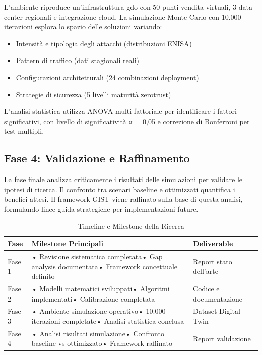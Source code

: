L'ambiente riproduce un'infrastruttura \gls{gdo} con 50 punti vendita virtuali, 3 data center regionali e integrazione cloud. La simulazione Monte Carlo con 10.000 iterazioni esplora lo spazio delle soluzioni variando:
\begin{itemize}
\item Intensità e tipologia degli attacchi (distribuzioni ENISA)
\item Pattern di traffico (dati stagionali reali)
\item Configurazioni architetturali (24 combinazioni deployment)
\item Strategie di sicurezza (5 livelli maturità \gls{zerotrust})
\end{itemize}

L'analisi statistica utilizza ANOVA multi-fattoriale per identificare i fattori significativi, con livello di significatività α = 0,05 e correzione di Bonferroni per test multipli.

\subsection{\texorpdfstring{Fase 4: Validazione e Raffinamento}{1.5.5 - Fase 4: Validazione e Raffinamento}}
\label{subsec:fase4}

La fase finale analizza criticamente i risultati delle simulazioni per validare le ipotesi di ricerca. Il confronto tra scenari baseline e ottimizzati quantifica i benefici attesi. Il framework GIST viene raffinato sulla base di questa analisi, formulando linee guida strategiche per implementazioni future.

\begin{table}[htbp]
\centering
\small
\caption{Timeline e Milestone della Ricerca}
\label{tab:timeline_ricerca}
\begin{tabularx}{\textwidth}{@{}lXl@{}}
\toprule
\textbf{Fase} & \textbf{Milestone Principali} & \textbf{Deliverable} \\
\midrule
Fase 1 & • Revisione sistematica completata\newline• Gap analysis documentata\newline• Framework concettuale definito & Report stato dell'arte \\
Fase 2 & • Modelli matematici sviluppati\newline• Algoritmi implementati\newline• Calibrazione completata & Codice e documentazione \\
Fase 3 & • Ambiente simulazione operativo\newline• 10.000 iterazioni completate\newline• Analisi statistica conclusa & Dataset Digital Twin \\
Fase 4 & • Analisi risultati simulazione\newline• Confronto baseline vs ottimizzato\newline• Framework raffinato & Report validazione \\
\bottomrule
\end{tabularx}
\end{table}

